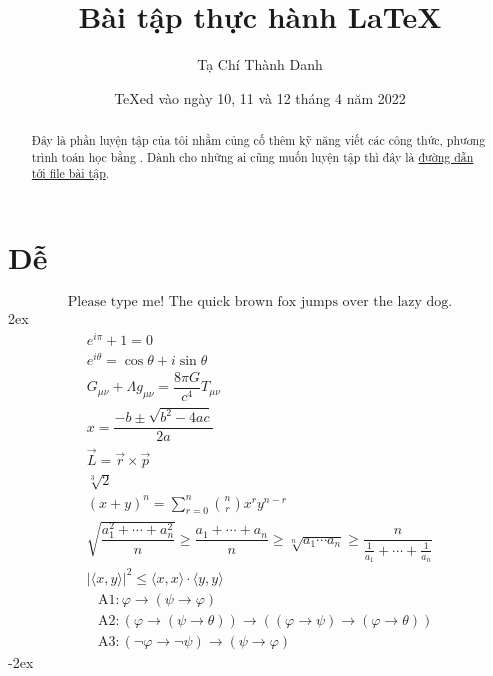 \documentclass[a4paper,12pt,notitlepage]{article}
\title{Bài tập thực hành \LaTeX}
\author{Tạ Chí Thành Danh}
\date{\TeX ed vào ngày 10, 11 và 12 tháng 4 năm 2022}
\newcommand{\f}[2]{\dfrac{#1}{#2}}
\begin{document}
	\maketitle
	\begin{abstract}
		Đây là phần luyện tập của tôi nhằm củng cố thêm kỹ năng viết các công thức, phương trình toán học bằng \LaTeXe.
		Dành cho những ai cũng muốn luyện tập thì đây là \href{https://web.mit.edu/~jgross/Public/latex/exercises.pdf}{đường dẫn tới file bài tập}.
	\end{abstract}
	\section{Dễ}
	\begin{equation}
		\text{Please type me! The quick brown fox jumps over the lazy dog.}
	\end{equation}
	\openup 2ex
	\begin{gather}
		e^{i \pi} + 1 = 0 \\
		e^{i \theta} = \cos \theta + i \sin \theta \\
		G_{\mu \nu} + \Lambda g_{\mu \nu} = \f{8\pi G}{c^4} T_{\mu \nu} \\
		x = \f{-b \pm \sqrt{b^2 - 4ac}}{2a} \\
		\vec{L} = \vec{r} \times \vec{p} \\
		\sqrt[3]{2} \\
		(x + y)^n = \sum_{r=0}^{n} \binom{n}{r} x^r y^{n-r} \\
		\sqrt{\f{a_1^2 + \cdots + a_n^2}{n}} \geq \f{a_1 + \cdots + a_n}{n} \geq \sqrt[n]{a_1 \cdots a_n} \geq \f{n}{\tfrac{1}{a_1} + \cdots + \tfrac{1}{a_n}} \\
		| \langle x, y \rangle | ^2 \leq \langle x, x \rangle \cdot \langle y, y \rangle %
	\end{gather}
	\begin{align}
	& \mathrm{A}1: \varphi \longrightarrow (\psi \rightarrow \varphi) \nonumber \\[-2ex]
	& \mathrm{A}2: (\varphi \rightarrow (\psi \rightarrow \theta)) \longrightarrow ((\varphi \rightarrow \psi) \rightarrow (\varphi \rightarrow \theta)) \nonumber \\[-2ex]
	& \mathrm{A}3: (\neg \varphi \rightarrow \neg \psi) \longrightarrow (\psi \rightarrow \varphi) 
	\end{align}
	\openup -2ex
\end{document}
